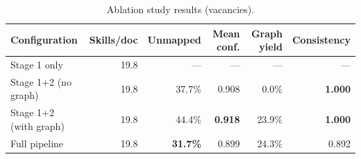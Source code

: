 \begin{table}[htbp]
  \centering
  \caption{Ablation study results (vacancies).}
  \label{tab:ablation-vac}
  \begin{tabular}{lrrrrr}
    \toprule
    Configuration & Skills/doc & Unmapped & Mean conf. & Graph yield & Consistency \\
    \midrule
  Stage 1 only & 19.8 & --- & --- & --- & --- \\
  Stage 1+2 (no graph) & 19.8 & 37.7\% & 0.908 & 0.0\% & \textbf{1.000} \\
  Stage 1+2 (with graph) & 19.8 & 44.4\% & \textbf{0.918} & 23.9\% & \textbf{1.000} \\
  Full pipeline & 19.8 & \textbf{31.7\%} & 0.899 & 24.3\% & 0.892 \\
    \bottomrule
  \end{tabular}
\end{table}